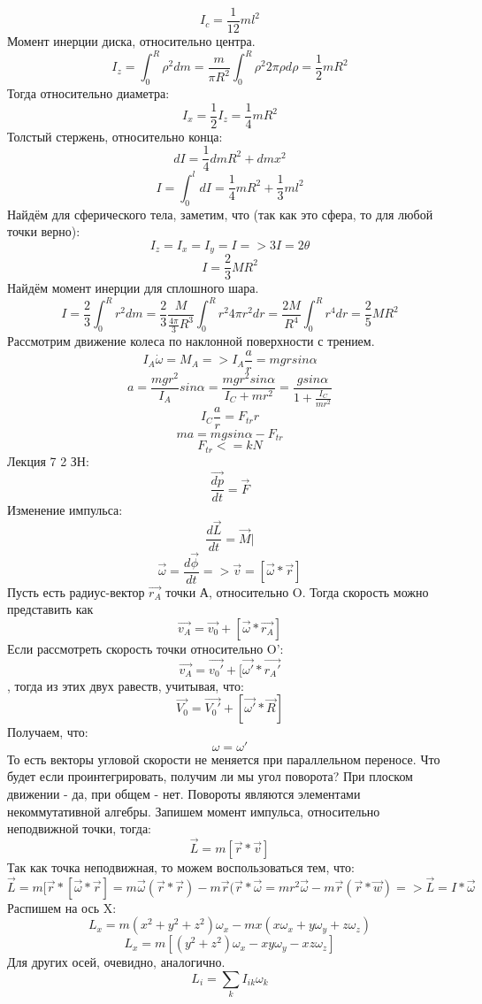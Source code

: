     \[I_c = \frac{1}{12}ml^2\]
    Момент инерции диска, относительно центра.
    \[I_z = \int_0^R\rho^2dm = \frac{m}{\pi R^2} \int_0^R \rho^2 2 \pi \rho d\rho = \frac{1}{2}mR^2\]
    Тогда относительно диаметра:
    \[I_x = \frac{1}{2}I_z = \frac{1}{4}mR^2\]
    Толстый стержень, относительно конца:
    \[dI = \frac{1}{4}dmR^2 + dmx^2\]
    \[I = \int_0^ldI = \frac{1}{4}mR^2 + \frac{1}{3}ml^2\]
    Найдём для сферического тела, заметим, что (так как это сфера, то для любой точки верно):
    \[I_z = I_x = I_y = I => 3I = 2\theta\]
    \[I = \frac{2}{3}MR^2\]
    Найдём момент инерции для сплошного шара.
    \[I = \frac{2}{3}\int_0^Rr^2dm = \frac{2}{3}\frac{M}{\frac{4\pi}{3}R^3}\int_0^R r^2 4 \pi r^2 dr = \frac{2M}{R^4}\int_0^R r^4 dr = \frac{2}{5}MR^2\]
    Рассмотрим движение колеса по наклонной поверхности с трением.
    \[I_A \dot \omega = M_A => I_A \frac{a}{r} = mgrsin\alpha\]
    \[a = \frac{mgr^2}{I_A}sin\alpha = \frac{mgr^2sin\alpha}{I_C + mr^2} = \frac{gsin\alpha}{1 + \frac{I_C}{mr^2}}\]
    \[I_C \frac{a}{r} = F_{tr}r\]
    \[ma = mgsin\alpha - F_{tr}\]
    \[F_{tr} <= kN\]
    Лекция 7
    2 ЗН:
    \[\frac{\Vec{dp}}{dt} = \Vec{F}\]
    Изменение импульса:
    \[\frac{d\Vec{L}}{dt} = \Vec{M}|\]
    \[\Vec{\omega} = \frac{d\Vec{\phi}}{dt} => \Vec{v} = [\Vec{\omega} * \Vec{r}]\]
    Пусть есть радиус-вектор $\Vec{r_A}$ точки А, относительно O.
    Тогда скорость можно представить как
    \[\Vec{v_A} = \Vec{v_0} + [\Vec{\omega} * \Vec{r_A}]\]
    Если рассмотреть скорость точки относительно O':
    \[\Vec{v_A} = \Vec{v_0'} + [\Vec{\omega'} * \Vec{r_A'}\], тогда из этих двух равеств, учитывая, что:
    \[\Vec{V_0} = \Vec{V_0'} + [\Vec{\omega'} * \Vec{R}]\]
    Получаем, что:
    \[\omega = \omega'\]
    То есть векторы угловой скорости не меняется при параллельном переносе.
    Что будет если проинтегрировать, получим ли мы угол поворота?
    При плоском движении - да, при общем - нет.
    Повороты являются элементами некоммутативной алгебры.
    Запишем момент импульса, относительно неподвижной точки, тогда:
    \[\Vec{L} = m[\Vec{r} * \Vec{v}]\]
    Так как точка неподвижная, то можем воспользоваться тем, что:
    \[\Vec{L} = m[\Vec{r} * [\Vec{\omega} * \Vec{r}] = m\Vec{\omega} (\Vec{r} * \Vec{r}) - m\Vec{r}(\Vec{r} * \Vec{\omega} = mr^2\Vec{\omega} - m\Vec{r}(\Vec{r} * \Vec{w}) => \Vec{L} = I * \Vec{\omega}\]
    Распишем на ось X:
    \[L_x = m(x^2 + y^2 + z^2)\omega_x - mx(x\omega_x + y\omega_y + z\omega_z)\]
    \[L_x = m[(y^2 + z^2)\omega_x - xy\omega_y - xz\omega_z]\]
    Для других осей, очевидно, аналогично.
    \[L_i = \sum_k I_{ik}\omega_k\]

